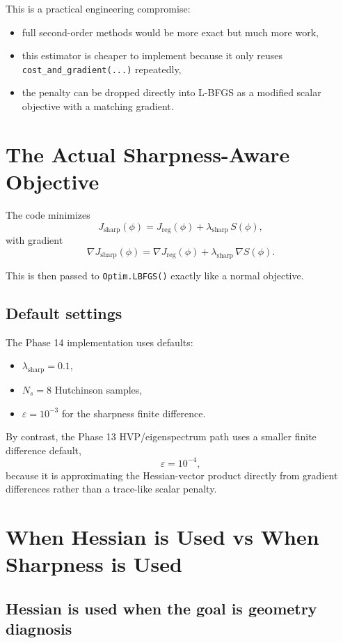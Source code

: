 \documentclass[11pt,letterpaper]{article}
\begin{document}
This is a practical engineering compromise:
\begin{itemize}[leftmargin=*]
  \item full second-order methods would be more exact but much more work,
  \item this estimator is cheaper to implement because it only reuses
  \texttt{cost\_and\_gradient(...)} repeatedly,
  \item the penalty can be dropped directly into L-BFGS as a modified scalar
  objective with a matching gradient.
\end{itemize}

\section{The Actual Sharpness-Aware Objective}

The code minimizes
\[
J_{\mathrm{sharp}}(\phi)
=
J_{\mathrm{reg}}(\phi)
+
\lambda_{\mathrm{sharp}}\, S(\phi),
\]
with gradient
\[
\nabla J_{\mathrm{sharp}}(\phi)
=
\nabla J_{\mathrm{reg}}(\phi)
+
\lambda_{\mathrm{sharp}}\, \nabla S(\phi).
\]

This is then passed to \texttt{Optim.LBFGS()} exactly like a normal objective.

\subsection{Default settings}

The Phase 14 implementation uses defaults:
\begin{itemize}[leftmargin=*]
  \item $\lambda_{\mathrm{sharp}} = 0.1$,
  \item $N_s = 8$ Hutchinson samples,
  \item $\varepsilon = 10^{-3}$ for the sharpness finite difference.
\end{itemize}

By contrast, the Phase 13 HVP/eigenspectrum path uses a smaller finite
difference default,
\[
\varepsilon = 10^{-4},
\]
because it is approximating the Hessian-vector product directly from gradient
differences rather than a trace-like scalar penalty.

\section{When Hessian is Used vs When Sharpness is Used}

\subsection{Hessian is used when the goal is geometry diagnosis}
\end{document}
